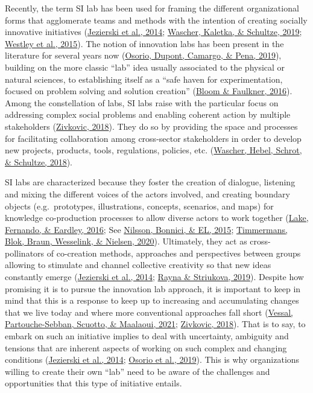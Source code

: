 \documentclass[]{elsarticle} %
\begin{document}
Recently, the term SI lab has been used for framing the different
organizational forms that agglomerate teams and methods with the
intention of creating socially innovative initiatives
(\protect\hyperlink{ref-Jezierski2014}{Jezierski et al., 2014};
\protect\hyperlink{ref-Wascher2019}{Wascher, Kaletka, \& Schultze,
2019}; \protect\hyperlink{ref-Westley2015}{Westley et al., 2015}). The
notion of innovation labs has been present in the literature for several
years now (\protect\hyperlink{ref-Osorio2019-A}{Osorio, Dupont, Camargo,
\& Pena, 2019}), building on the more classic ``lab'' idea usually
associated to the physical or natural sciences, to establishing itself
as a ``safe haven for experimentation, focused on problem solving and
solution creation'' (\protect\hyperlink{ref-Bloom2016}{Bloom \&
Faulkner, 2016}). Among the constellation of labs, SI labs raise with
the particular focus on addressing complex social problems and enabling
coherent action by multiple stakeholders
(\protect\hyperlink{ref-Zivkovic2018}{Zivkovic, 2018}). They do so by
providing the space and processes for facilitating collaboration among
cross-sector stakeholders in order to develop new projects, products,
tools, regulations, policies, etc.
(\protect\hyperlink{ref-Wascher2018}{Wascher, Hebel, Schrot, \&
Schultze, 2018}).

SI labs are characterized because they foster the creation of dialogue,
listening and mixing the different voices of the actors involved, and
creating boundary objects (e.g.~prototypes, illustrations, concepts,
scenarios, and maps) for knowledge co-production processes to allow
diverse actors to work together (\protect\hyperlink{ref-Lake2016}{Lake,
Fernando, \& Eardley, 2016}; See
\protect\hyperlink{ref-Nilsson2015}{Nilsson, Bonnici, \& EL, 2015};
\protect\hyperlink{ref-Timmermans2020}{Timmermans, Blok, Braun,
Wesselink, \& Nielsen, 2020}). Ultimately, they act as cross-pollinators
of co-creation methods, approaches and perspectives between groups
allowing to stimulate and channel collective creativity so that new
ideas constantly emerge (\protect\hyperlink{ref-Jezierski2014}{Jezierski
et al., 2014}; \protect\hyperlink{ref-Rayna2019}{Rayna \& Striukova,
2019}). Despite how promising it is to pursue the innovation lab
approach, it is important to keep in mind that this is a response to
keep up to increasing and accumulating changes that we live today and
where more conventional approaches fall short
(\protect\hyperlink{ref-RezaeeVessal2021}{Vessal, Partouche-Sebban,
Scuotto, \& Maalaoui, 2021};
\protect\hyperlink{ref-Zivkovic2018}{Zivkovic, 2018}). That is to say,
to embark on such an initiative implies to deal with uncertainty,
ambiguity and tensions that are inherent aspects of working on such
complex and changing conditions
(\protect\hyperlink{ref-Jezierski2014}{Jezierski et al., 2014};
\protect\hyperlink{ref-Osorio2019}{Osorio et al., 2019}). This is why
organizations willing to create their own ``lab'' need to be aware of
the challenges and opportunities that this type of initiative entails.
\end{document}
